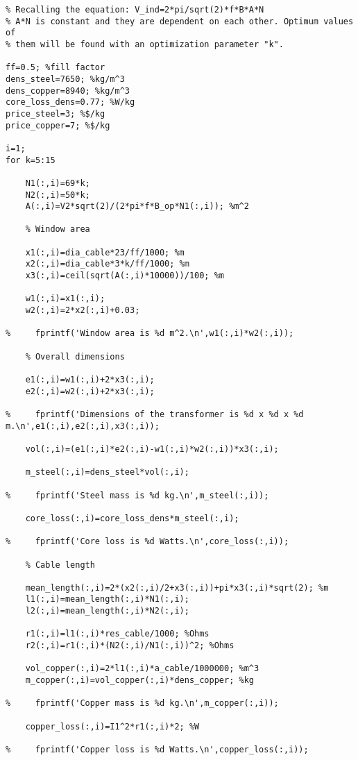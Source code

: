 \begin{verbatim}
% Recalling the equation: V_ind=2*pi/sqrt(2)*f*B*A*N
% A*N is constant and they are dependent on each other. Optimum values of
% them will be found with an optimization parameter "k".

ff=0.5; %fill factor
dens_steel=7650; %kg/m^3
dens_copper=8940; %kg/m^3
core_loss_dens=0.77; %W/kg
price_steel=3; %$/kg
price_copper=7; %$/kg

i=1;
for k=5:15

    N1(:,i)=69*k;
    N2(:,i)=50*k;
    A(:,i)=V2*sqrt(2)/(2*pi*f*B_op*N1(:,i)); %m^2

    % Window area

    x1(:,i)=dia_cable*23/ff/1000; %m
    x2(:,i)=dia_cable*3*k/ff/1000; %m
    x3(:,i)=ceil(sqrt(A(:,i)*10000))/100; %m

    w1(:,i)=x1(:,i);
    w2(:,i)=2*x2(:,i)+0.03;

%     fprintf('Window area is %d m^2.\n',w1(:,i)*w2(:,i));

    % Overall dimensions

    e1(:,i)=w1(:,i)+2*x3(:,i);
    e2(:,i)=w2(:,i)+2*x3(:,i);

%     fprintf('Dimensions of the transformer is %d x %d x %d m.\n',e1(:,i),e2(:,i),x3(:,i));

    vol(:,i)=(e1(:,i)*e2(:,i)-w1(:,i)*w2(:,i))*x3(:,i);

    m_steel(:,i)=dens_steel*vol(:,i);

%     fprintf('Steel mass is %d kg.\n',m_steel(:,i));

    core_loss(:,i)=core_loss_dens*m_steel(:,i);

%     fprintf('Core loss is %d Watts.\n',core_loss(:,i));

    % Cable length

    mean_length(:,i)=2*(x2(:,i)/2+x3(:,i))+pi*x3(:,i)*sqrt(2); %m
    l1(:,i)=mean_length(:,i)*N1(:,i);
    l2(:,i)=mean_length(:,i)*N2(:,i);

    r1(:,i)=l1(:,i)*res_cable/1000; %Ohms
    r2(:,i)=r1(:,i)*(N2(:,i)/N1(:,i))^2; %Ohms

    vol_copper(:,i)=2*l1(:,i)*a_cable/1000000; %m^3
    m_copper(:,i)=vol_copper(:,i)*dens_copper; %kg

%     fprintf('Copper mass is %d kg.\n',m_copper(:,i));

    copper_loss(:,i)=I1^2*r1(:,i)*2; %W

%     fprintf('Copper loss is %d Watts.\n',copper_loss(:,i));


\end{verbatim}
